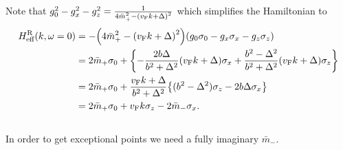 \documentclass[english, parskip=full]{scrartcl}
\begin{document}
Note that $g_0^2-g_x^2-g_z^2 = \frac{1}{4\bar{m}_+^2 - \kla*{\vf k + \Delta}^2}$ which simplifies the Hamiltonian to
\begin{align}
H_\Text{eff}^\R(k,\omega=0) &= -\kla*{4\bar{m}_+^2 - \kla*{\vf k + \Delta}^2} \kla*{g_0\sigma_0 - g_x\sigma_x - g_z\sigma_z}\\
&= 2\bar{m}_+\sigma_0 + \klc*{-\frac{2b\Delta}{b^2 + \Delta^2} \kla*{\vf k + \Delta} \sigma_x + \frac{b^2-\Delta^2}{b^2 + \Delta^2} \kla*{\vf k + \Delta} \sigma_z}\\
&= 2\bar{m}_+ \sigma_0 + \frac{\vf k + \Delta}{b^2 + \Delta^2} \klc*{ (b^2 - \Delta^2) \sigma_z - 2b\Delta \sigma_x}\\
&= 2\bar{m}_+ \sigma_0 + \vf k \sigma_z - 2\bar{m}_- \sigma_x.
\end{align}
\\
In order to get exceptional points we need a fully imaginary $\bar{m}_-$.



\end{document}
